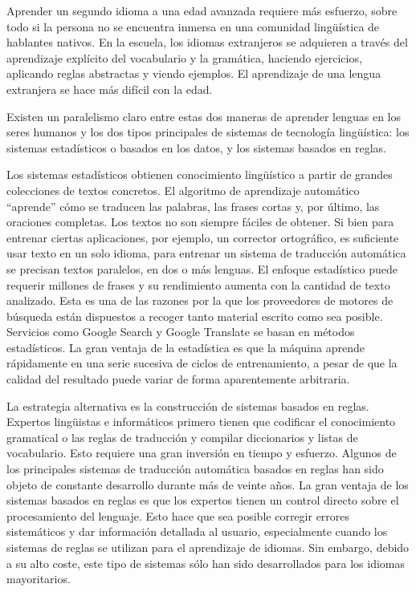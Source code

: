 \begin{multicols}{2}
Aprender un segundo idioma a una edad avanzada requiere más esfuerzo, sobre todo si la persona no se encuentra inmersa en una comunidad lingüística de hablantes nativos. En la escuela, los idiomas extranjeros se adquieren a través del aprendizaje explícito del vocabulario y la gramática, haciendo ejercicios, aplicando reglas abstractas y viendo ejemplos. El aprendizaje de una lengua extranjera se hace más difícil con la edad. 

Existen un paralelismo claro entre estas dos maneras de aprender lenguas en los seres humanos y los dos tipos principales de sistemas de tecnología lingüística: los sistemas estadísticos o basados en los datos, y los sistemas basados en reglas.  

Los sistemas estadísticos obtienen conocimiento lingüístico a partir de grandes colecciones de textos concretos. El algoritmo de aprendizaje automático ``aprende'' cómo se traducen las palabras, las frases cortas y, por último, las oraciones completas. Los textos no son siempre fáciles de obtener. Si bien para entrenar ciertas aplicaciones, por ejemplo, un corrector ortográfico, es suficiente usar texto en un solo idioma, para entrenar un sistema de traducción automática se precisan  textos paralelos, en dos o más lenguas. El enfoque estadístico puede requerir millones de frases y su rendimiento aumenta con la cantidad de texto analizado. Esta es una de las razones por la que los proveedores de motores de búsqueda están dispuestos a recoger tanto material escrito como sea posible. Servicios como Google Search y Google Translate se basan en métodos estadísticos. La gran ventaja de la estadística es que la máquina aprende rápidamente en una serie sucesiva de ciclos de entrenamiento, a pesar de que la calidad del resultado puede variar de forma aparentemente arbitraria.

La estrategia alternativa es la construcción de sistemas basados en reglas. Expertos lingüistas e informáticos primero tienen que codificar el conocimiento gramatical o las reglas de traducción y compilar diccionarios y listas de vocabulario. Esto requiere una gran inversión en tiempo y esfuerzo. Algunos de los principales sistemas de traducción automática basados en reglas han sido objeto de constante desarrollo durante más de veinte años. La gran ventaja de los sistemas basados en reglas es que los expertos tienen un control directo sobre el procesamiento del lenguaje. Esto hace que sea posible corregir errores sistemáticos y dar información detallada al usuario, especialmente cuando los sistemas de reglas se utilizan para el aprendizaje de idiomas. Sin embargo, debido a su alto coste, este tipo de sistemas sólo han sido desarrollados para los idiomas mayoritarios.


\end{multicols}
